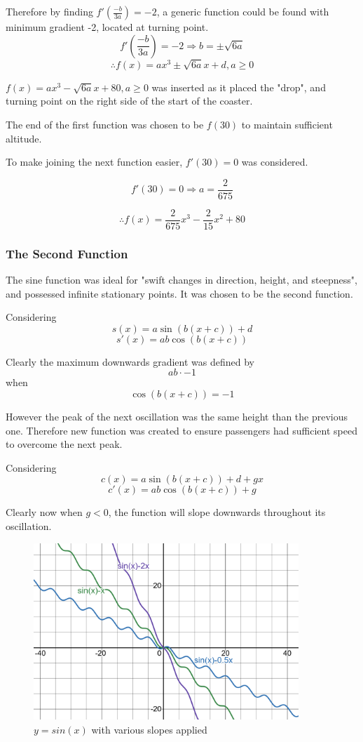 \documentclass[10pt, letterpaper]{article}
\begin{document}
Therefore by finding $f'(\frac{-b}{3a})=-2$, a generic function could be found with minimum gradient -2, located at turning point.
 $$f'(\frac{-b}{3a})=-2\Rightarrow b=\pm\sqrt{6a}$$
$$\therefore f(x)=ax^3\pm\sqrt{6a}x+d, a\geq0$$

$f(x)=ax^3-\sqrt{6a}x+80, a\geq0$ was inserted as it placed the "drop", and turning point on the right side of the start of the coaster.

The end of the first function was chosen to be $f(30)$ to maintain sufficient altitude.

To make joining the next function easier, $f'(30)=0$ was considered. 

$$f'(30)=0 \Rightarrow a=\frac{2}{675}$$

$$\therefore f(x)=\frac{2}{675}x^{3}-\frac{2}{15}x^{2}+80$$


\subsubsection{The Second Function}
The sine function was ideal for "swift changes in direction, height, and steepness", and possessed infinite stationary points. It was chosen to be the second function.

Considering 
$$s(x)=a\sin(b(x+c))+d $$
$$s'(x)=ab\cos(b(x+c))$$

Clearly the maximum downwards gradient was defined by $$ab\cdot-1$$
when
$$\cos(b(x+c))=-1$$

However the peak of the next oscillation was the same height than the previous one. Therefore new function was created to ensure passengers had sufficient speed to overcome the next peak.

Considering
$$c(x)=a\sin(b(x+c))+d+gx$$ 
$$c'(x)=ab\cos(b(x+c))+g$$

Clearly now when $g<0$, the function will slope downwards throughout its oscillation. 

	\begin{figure}[h!]
		\centering
		\includegraphics[width=10cm]{c(x).png}
		\caption{$y=sin(x)$ with various slopes applied}
	\end{figure}
\end{document}
